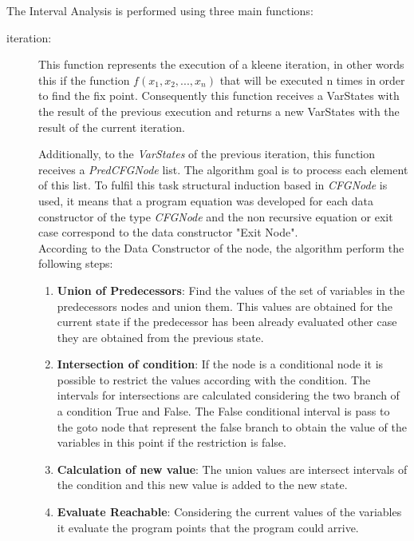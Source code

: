 \documentclass{article}
\begin{document}
The Interval Analysis is performed using three main functions:

\begin{description}
  \item[iteration:] This function represents the execution of a kleene iteration, in other words
    this if the function $ f(x_{1},x_{2},...,x_{n}) $ that will be executed n times in order to find the fix
    point. Consequently this function receives a VarStates with the result of the previous
    execution and returns a new VarStates with the result of the current iteration.

    Additionally, to the \emph{VarStates} of the previous iteration, this function receives a
    \emph{ PredCFGNode } list. The algorithm goal is to process each element of this list. To fulfil this
    task structural induction based in \emph{ CFGNode } is used, it means that a program equation
    was developed for each data constructor of the type \emph{ CFGNode } and the non recursive
    equation or exit case correspond to the data constructor "Exit Node".
    \\

    According to the Data Constructor of the node, the algorithm perform the following
    steps:

    \begin{enumerate}
      \item \textbf{Union of Predecessors}: Find the values of the set of variables in the predecessors
        nodes and union them. This values are obtained for the current state if the
        predecessor has been already evaluated other case they are obtained from the
        previous state.
      \item \textbf{Intersection of condition}: If the node is a conditional node it is possible to
        restrict the values according with the condition. The intervals for intersections
        are calculated considering the two branch of a condition True and False. The
        False conditional interval is pass to the goto node that represent the false
        branch to obtain the value of the variables in this point if the restriction is false.
      \item \textbf{Calculation of new value}: The union values are intersect intervals of the
        condition and this new value is added to the new state.
      \item \textbf{Evaluate Reachable}: Considering the current values of the variables it evaluate
        the program points that the program could arrive.
    \end{enumerate}



\end{description}
\end{document}
